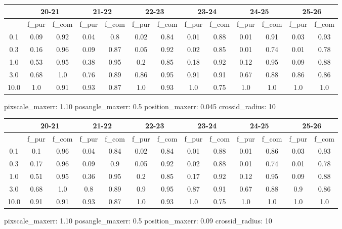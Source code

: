 \documentclass{article}
\begin{document}
\begin{figure}[H]
\centering
\begin{tabular}{|c|c|c|c|c|c|c|c|c|c|c|c|c|}
\hline
\multicolumn{1}{|c|}{} & \multicolumn{2}{|c|}{20-21} & \multicolumn{2}{|c|}{21-22} & \multicolumn{2}{|c|}{22-23} & \multicolumn{2}{|c|}{23-24} & \multicolumn{2}{|c|}{24-25} & \multicolumn{2}{|c|}{25-26}\\
\hline \hline
 & f\_pur & f\_com & f\_pur & f\_com & f\_pur & f\_com & f\_pur & f\_com & f\_pur & f\_com & f\_pur & f\_com \\
\hline
0.1 & 0.09 & 0.92 & 0.04 & 0.8 & 0.02 & 0.84 & 0.01 & 0.88 & 0.01 & 0.91 & 0.03 & 0.93\\
\hline
0.3 & 0.16 & 0.96 & 0.09 & 0.87 & 0.05 & 0.92 & 0.02 & 0.85 & 0.01 & 0.74 & 0.01 & 0.78\\
\hline
1.0 & 0.53 & 0.95 & 0.38 & 0.95 & 0.2 & 0.85 & 0.18 & 0.92 & 0.12 & 0.95 & 0.09 & 0.88\\
\hline
3.0 & 0.68 & 1.0 & 0.76 & 0.89 & 0.86 & 0.95 & 0.91 & 0.91 & 0.67 & 0.88 & 0.86 & 0.86\\
\hline
10.0 & 1.0 & 0.91 & 0.93 & 0.87 & 1.0 & 0.93 & 1.0 & 0.75 & 1.0 & 1.0 & 1.0 & 1.0\\
\hline
\end{tabular}
\caption{pixscale\_maxerr: 1.10 posangle\_maxerr: 0.5 position\_maxerr: 0.045 crossid\_radius: 10}
\end{figure}

\begin{figure}[H]
\centering
\begin{tabular}{|c|c|c|c|c|c|c|c|c|c|c|c|c|}
\hline
\multicolumn{1}{|c|}{} & \multicolumn{2}{|c|}{20-21} & \multicolumn{2}{|c|}{21-22} & \multicolumn{2}{|c|}{22-23} & \multicolumn{2}{|c|}{23-24} & \multicolumn{2}{|c|}{24-25} & \multicolumn{2}{|c|}{25-26}\\
\hline \hline
 & f\_pur & f\_com & f\_pur & f\_com & f\_pur & f\_com & f\_pur & f\_com & f\_pur & f\_com & f\_pur & f\_com \\
\hline
0.1 & 0.1 & 0.96 & 0.04 & 0.84 & 0.02 & 0.84 & 0.01 & 0.88 & 0.01 & 0.86 & 0.03 & 0.93\\
\hline
0.3 & 0.17 & 0.96 & 0.09 & 0.9 & 0.05 & 0.92 & 0.02 & 0.88 & 0.01 & 0.74 & 0.01 & 0.78\\
\hline
1.0 & 0.51 & 0.95 & 0.36 & 0.95 & 0.2 & 0.85 & 0.17 & 0.92 & 0.12 & 0.95 & 0.09 & 0.88\\
\hline
3.0 & 0.68 & 1.0 & 0.8 & 0.89 & 0.9 & 0.95 & 0.87 & 0.91 & 0.67 & 0.88 & 0.9 & 0.86\\
\hline
10.0 & 0.91 & 0.91 & 0.93 & 0.87 & 1.0 & 0.93 & 1.0 & 0.75 & 1.0 & 1.0 & 1.0 & 1.0\\
\hline
\end{tabular}
\caption{pixscale\_maxerr: 1.10 posangle\_maxerr: 0.5 position\_maxerr: 0.09 crossid\_radius: 10}
\end{figure}
\end{document}
